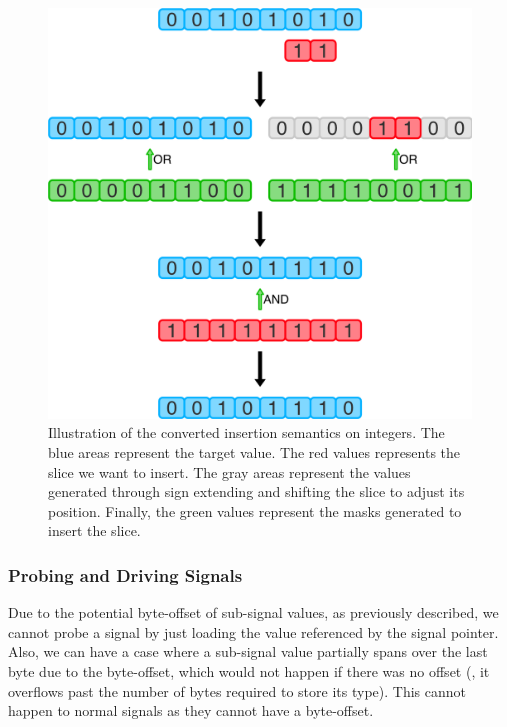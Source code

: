 \begin{figure}[ht]
    \includegraphics[width=\textwidth]{gfx/InsertInt.png}
    \caption[Illustration of the converted insertion semantics on integers.]{Illustration of the converted insertion semantics on integers. The blue areas represent the target value. The red values represents the slice we want to insert. The gray areas represent the values generated through sign extending and shifting the slice to adjust its position. Finally, the green values represent the masks generated to insert the slice.}
    \label{fig:insert_int}
\end{figure}


\subsubsection{Probing and Driving Signals}
Due to the potential byte-offset of sub-signal values, as previously described, we cannot probe a signal by just loading the value referenced by the signal pointer. Also, we can have a case where a sub-signal value partially spans over the last byte due to the byte-offset, which would not happen if there was no offset (\ie, it overflows past the number of bytes required to store its type). This cannot happen to normal signals as they cannot have a byte-offset.

